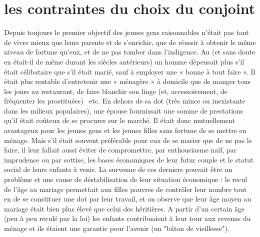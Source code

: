 \section{les contraintes du choix du conjoint}
 
 Depuis toujours le premier objectif des jeunes gens raisonnables n'était pas tant de vivre mieux que leurs parents et de s'enrichir, que de réussir à obtenir le même niveau de fortune qu'eux, et de ne pas tomber dans l'indigence. Au  (et sans doute en était-il de même durant les siècles antérieurs) un homme dépensait plus s'il était célibataire que s'il était marié, sauf à employer une « bonne à tout faire ». Il était plus rentable d'entretenir une « ménagère » à domicile que de manger tous les jours au restaurant, de faire blanchir son linge (et, accessoirement, de fréquenter les prostituées) ~etc. En dehors de sa dot (très mince ou inexistante dans les milieux populaires), une épouse fournissait une somme de prestations qu'il était coûteux de se procurer sur le marché. Il était donc mutuellement avantageux pour les jeunes gens et les jeunes filles sans fortune de se mettre en ménage. Mais s'il était souvent préférable pour eux de se marier que de ne pas le faire, il leur fallait aussi éviter de compromettre, par enthousiasme naïf, par imprudence ou par sottise, les bases économiques de leur futur couple et le statut social de leurs enfants à venir. La survenue de ces derniers pouvait être un problème et une cause de déstabilisation de leur situation économique : le recul de l'âge au mariage permettait aux filles pauvres de contrôler leur nombre tout en de se constituer une dot par leur travail, et on observe que leur âge moyen au mariage était bien plus élevé que celui des héritières. A partir d'un certain âge (peu à peu reculé par la loi) les enfants contribuaient à leur tour aux revenus du ménage et ils étaient une garantie pour l'avenir (un "bâton de vieillesse"). 


